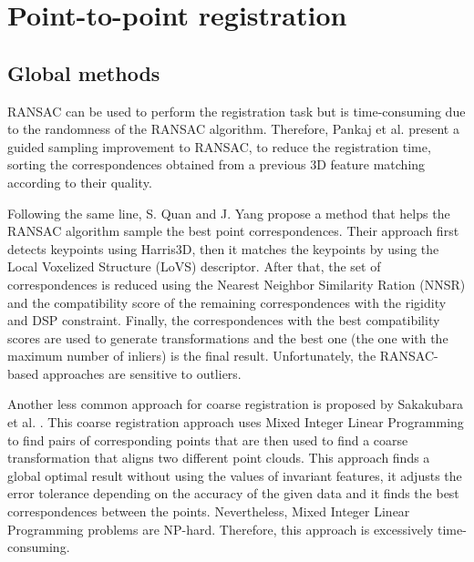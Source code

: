     \section{Point-to-point registration}
        \subsection{Global methods}

        RANSAC \cite{Fischler_1981_RANSAC} can be used to perform the registration task but is time-consuming due to the randomness
        of the RANSAC algorithm. Therefore, Pankaj et al. \cite{Pankaj_2015_arobust} present a guided sampling improvement to RANSAC,
        to reduce the registration time, sorting the correspondences obtained from a previous 3D feature matching according to their quality.
        
        Following the same line, S. Quan and J. Yang \cite{Quan_2020_com} propose a method that helps the RANSAC algorithm 
        sample the best point correspondences. Their approach first detects keypoints using Harris3D, then it matches the keypoints
        by using the Local Voxelized Structure (LoVS) descriptor. After that, the set of correspondences is reduced using the 
        Nearest Neighbor Similarity Ration (NNSR) and the compatibility score of the remaining correspondences with the rigidity and 
        DSP constraint. Finally, the correspondences with the best compatibility scores are used to generate transformations and 
        the best one (the one with the maximum number of inliers) is the final result. Unfortunately, the RANSAC-based approaches are sensitive to outliers.

        Another less common approach for coarse registration is proposed by Sakakubara et al. \cite{Sakakubara_2007_automatic}.
        This coarse registration approach uses Mixed Integer Linear Programming to find pairs of corresponding points that are then 
        used to find a coarse transformation that aligns two different point clouds.
        This approach finds a global optimal result without using the values of invariant features, 
        it adjusts the error tolerance depending on the accuracy of the given data and 
        it finds the best correspondences between the points.
        Nevertheless, Mixed Integer Linear Programming problems are NP-hard. Therefore, this approach is excessively time-consuming.

